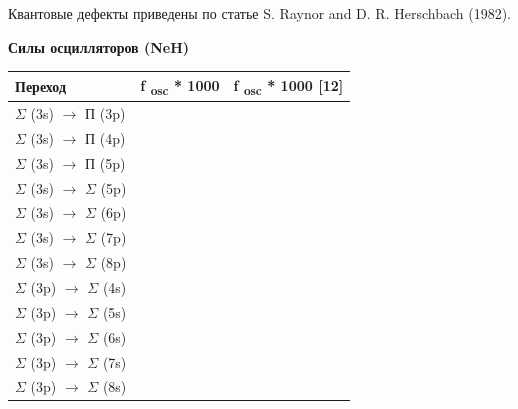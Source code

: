 Квантовые дефекты приведены по
статье \foreignlanguage{english}{S}. \foreignlanguage{english}{Raynor}
\foreignlanguage{english}{and} \foreignlanguage{english}{D}. \foreignlanguage{english}{R}.
\foreignlanguage{english}{Herschbach} (1982).


\bigskip

{\centering
\textbf{Силы
осцилляторов
(}\foreignlanguage{english}{\textbf{NeH}}\textbf{)}
\par}

\begin{flushleft}
\tablefirsthead{}
\tablehead{}
\tabletail{}
\tablelasttail{}
\begin{supertabular}{|m{5.4360003cm}|m{6.3630004cm}|m{4.584cm}|}
\hline
\textbf{{Переход}} &
\textbf{{f }}\textbf{{\textsubscript{osc }}}\textbf{{* 1000}} &
\textbf{{f }}\textbf{{\textsubscript{osc}}}\textbf{{ * 1000
[}}\foreignlanguage{english}{\textbf{{12}}}\textbf{{]}}\\\hline
{$\Sigma $ (3s) $\rightarrow $ П (3p)} &
 &
\raggedleft{}\\
{$\Sigma $ (3s) $\rightarrow $ П (4p)} &
 &
\raggedleft{}\\
{$\Sigma $ (3s) $\rightarrow $ П (5p)} &
 &
\raggedleft{}\\\hline
{$\Sigma $ (3s) $\rightarrow $ $\Sigma $ (5p)} &
 &
\raggedleft{}\\
{$\Sigma $ (3s) $\rightarrow $ $\Sigma $ (6p)} &
 &
\raggedleft{}\\
{$\Sigma $ (3s) $\rightarrow $ $\Sigma $ (7p)} &
 &
\raggedleft{}\\
{$\Sigma $ (3s) $\rightarrow $ $\Sigma $ (8p)} &
 &
\raggedleft{}\\\hline
{$\Sigma $ (3p) $\rightarrow $ $\Sigma $ (4s)} &
 &
\raggedleft{}\\
{$\Sigma $ (3p) $\rightarrow $ $\Sigma $ (5s)} &
 &
\raggedleft{}\\
{$\Sigma $ (3p) $\rightarrow $ $\Sigma $ (6s)} &
 &
\raggedleft{}\\
{$\Sigma $ (3p) $\rightarrow $ $\Sigma $ (7s)} &
 &
\raggedleft{}\\
{$\Sigma $ (3p) $\rightarrow $ $\Sigma $ (8s)} &

\end{supertabular}
\end{flushleft}

